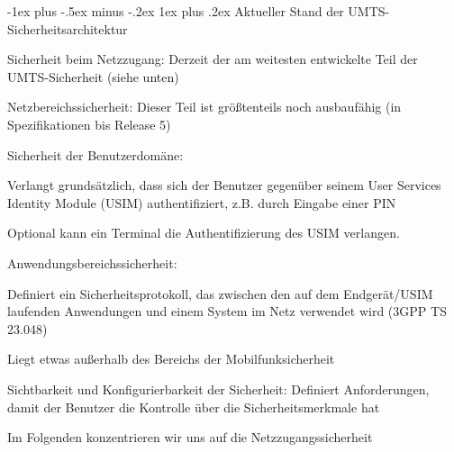 \documentclass[a4paper]{article}
\makeatletter
\renewcommand{\subsubsection}{\@startsection{subsubsection}{3}{0mm}%
 {-1ex plus -.5ex minus -.2ex}%
 {1ex plus .2ex}%
 {\normalfont\small\bfseries}}
\makeatother
\begin{document}
\begin{multicols}{3}
      \subsubsection{Aktueller Stand der UMTS-Sicherheitsarchitektur}
      \begin{itemize*}
            \item Sicherheit beim Netzzugang: Derzeit der am weitesten entwickelte Teil der UMTS-Sicherheit (siehe unten)
            \item Netzbereichssicherheit: Dieser Teil ist größtenteils noch ausbaufähig (in Spezifikationen bis Release 5)
            \item Sicherheit der Benutzerdomäne:
            \begin{itemize*}
                  \item Verlangt grundsätzlich, dass sich der Benutzer gegenüber seinem User Services Identity Module (USIM) authentifiziert, z.B. durch Eingabe einer PIN
                  \item Optional kann ein Terminal die Authentifizierung des USIM verlangen.
            \end{itemize*}
            \item Anwendungsbereichssicherheit:
            \begin{itemize*}
                  \item Definiert ein Sicherheitsprotokoll, das zwischen den auf dem Endgerät/USIM laufenden Anwendungen und einem System im Netz verwendet wird (3GPP TS 23.048)
                  \item Liegt etwas außerhalb des Bereichs der Mobilfunksicherheit
            \end{itemize*}
            \item Sichtbarkeit und Konfigurierbarkeit der Sicherheit: Definiert Anforderungen, damit der Benutzer die Kontrolle über die Sicherheitsmerkmale hat
            \item Im Folgenden konzentrieren wir uns auf die Netzzugangssicherheit
      \end{itemize*}


\end{multicols}
\end{document}
